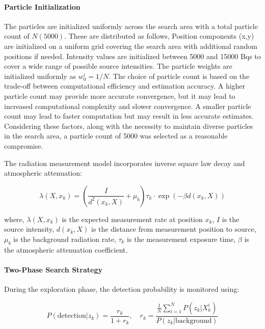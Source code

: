 \documentclass[../report.tex]{subfiles}
\begin{document}
    \paragraph{Particle Initialization}
    The particles are initialized uniformly across the search area with a total particle count of $N (5000)$. These are distributed as follows, Position components (x,y) are initialized on a 
    uniform grid covering the search area with additional random positions if needed. Intensity values are initialized between 5000 and 15000 Bqs to cover a wide range of 
    possible source intensities. The particle weights are initialized uniformly as $w_0^i = 1/N$. The choice of particle count is based on the trade-off 
    between computational efficiency and estimation accuracy. A higher particle count may provide more accurate convergence, but it may lead to increased 
    computational complexity and slower convergence. A smaller particle count may lead to faster computation but may result in less accurate estimates. Considering 
    these factors, along with the necessity to maintain diverse particles in the search area, a particle count of 5000 was selected as a reasonable compromise.


    The radiation measurement model incorporates inverse square law decay and atmospheric attenuation:

    \begin{equation}
    \lambda(X, x_k) = \left(\frac{I}{d^2(x_k, X)} + \mu_b\right)\tau_k \cdot \exp(-\beta d(x_k, X))
    \end{equation}

    where, $\lambda(X, x_k)$ is the expected measurement rate at position $x_k$, $I$ is the source intensity, $d(x_k, X)$ is the distance from measurement position to source, $\mu_b$ is the 
    background radiation rate, $\tau_k$ is the measurement exposure time, $\beta$ is the atmospheric attenuation coefficient.

    \paragraph{Two-Phase Search Strategy}
    During the exploration phase, the detection probability is monitored using:

    \begin{equation}
    P(\text{detection}|z_k) = \frac{r_k}{1 + r_k}, \quad r_k = \frac{\frac{1}{N}\sum_{i=1}^N P(z_k|X_k^i)}{P(z_k|\text{background})}
    \label{eq:prob_detection}
    \end{equation}
\end{document}
